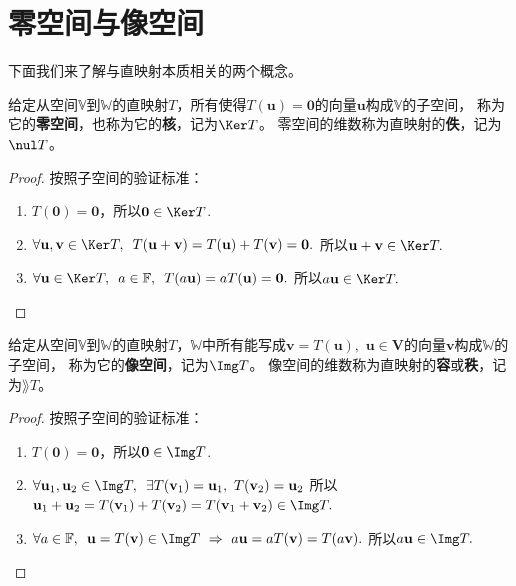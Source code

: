 \documentclass[12pt,UTF8,fontset=none]{ctexbook}
\begin{document}
\section{零空间与像空间}
下面我们来了解与直映射本质相关的两个概念。
\begin{pp}\label{pp:3_2}
    给定从空间$\mathbb{V}$到$\mathbb{W}$的直映射$T$，所有使得$T(\mathbf{u}) = \mathbf{0}$的向量$\mathbf{u}$构成$\mathbb{V}$的子空间，
    称为它的\textbf{零空间}，也称为它的\textbf{核}，记为$\Ker T$。
    零空间的维数称为直映射的\textbf{佚}，记为$\nul T$。
\end{pp}
\begin{proof} %
    按照子空间的验证标准：
    \begin{enumerate}
        \item $T(\mathbf{0}) = \mathbf{0}$，所以$\mathbf{0} \in \Ker T$.
        \item $\forall \mathbf{u}, \mathbf{v} \in \Ker T, \,\,\, T(\mathbf{u} + \mathbf{v}) = T(\mathbf{u}) + T(\mathbf{v}) = \mathbf{0}.$ 所以$\mathbf{u} + \mathbf{v} \in \Ker T.$
        \item $\forall \mathbf{u} \in \Ker T,\,\,\, a\in\mathbb{F},\,\,\, T(a\mathbf{u}) = aT(\mathbf{u}) = \mathbf{0}.$ 所以$a\mathbf{u} \in \Ker T.$
    \end{enumerate}
\end{proof}


\begin{pp}\label{pp:3_3}
    给定从空间$\mathbb{V}$到$\mathbb{W}$的直映射$T$，$\mathbb{W}$中所有能写成$\mathbf{v} = T(\mathbf{u}),\,\,\mathbf{u}\in\mathbf{V}$的向量$\mathbf{v}$构成$\mathbb{W}$的子空间，
    称为它的\textbf{像空间}，记为$\Img T$。
    像空间的维数称为直映射的\textbf{容}或\textbf{秩}，记为$\rang T$。
\end{pp}
\begin{proof} %
    按照子空间的验证标准：
    \begin{enumerate}
        \item $T(\mathbf{0}) = \mathbf{0}$，所以$\mathbf{0} \in \Img T$.
        \item $\forall \mathbf{u}_1, \mathbf{u}_2 \in \Img T, \,\,\, \exists T(\mathbf{v}_1) = \mathbf{u}_1,\,\,T(\mathbf{v}_2) = \mathbf{u}_2$ 所以$\mathbf{u}_1 + \mathbf{u}_2 = T(\mathbf{v}_1) + T(\mathbf{v}_2) = T(\mathbf{v}_1 + \mathbf{v}_2) \in \Img T.$
        \item $\forall  a\in\mathbb{F},\,\,\,\mathbf{u} = T(\mathbf{v}) \in \Img T\,\, \Rightarrow \,\, a\mathbf{u} = aT(\mathbf{v}) = T(a\mathbf{v}).$ 所以$a\mathbf{u} \in \Img T.$
    \end{enumerate}
\end{proof}
\end{document}
